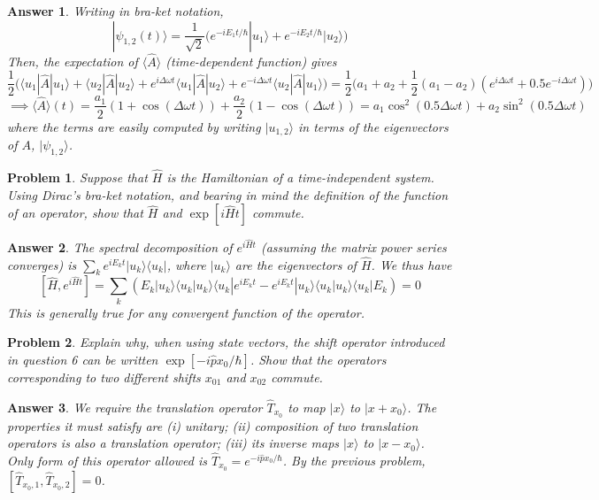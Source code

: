 \documentclass[a4paper]{article}
\newtheorem{ans}{Answer}[section]
\theoremstyle{new}
\newtheorem{qns}{Problem}[section]
\begin{document}
\begin{ans}
Writing in bra-ket notation,
$$|\psi_{1,2}(t)\rangle=\frac{1}{\sqrt{2}}\bigg(e^{-iE_1t/\hbar}|u_1\rangle+e^{-iE_2t/\hbar}|u_2\rangle\bigg)$$
Then, the expectation of $\langle\hat{A}\rangle$ (time-dependent function) gives
$$\frac{1}{2}\bigg(\langle u_1|\hat{A}|u_1\rangle+\langle u_2|\hat{A}|u_2\rangle+e^{i\Delta\omega t}\langle u_1|\hat{A}|u_2\rangle+e^{-i\Delta\omega t}\langle u_2|\hat{A}|u_1\rangle\bigg)=\frac{1}{2}\bigg(a_1+a_2+\frac{1}{2}(a_1-a_2)(e^{i\Delta\omega t}+0.5e^{-i\Delta\omega t})\bigg)$$
$$\implies\langle\hat{A}\rangle(t)=\frac{a_1}{2}(1+\cos(\Delta\omega t))+\frac{a_2}{2}(1-\cos(\Delta\omega t))=a_1\cos^2(0.5\Delta\omega t)+a_2\sin^2(0.5\Delta\omega t)$$
where the terms are easily computed by writing $|u_{1,2}\rangle$ in terms of the eigenvectors of $A$, $|\psi_{1,2}\rangle$.
\end{ans}
\begin{qns}
Suppose that $\hat{H}$ is the Hamiltonian of a time-independent system. Using Dirac's bra-ket notation, and bearing in mind the definition of the function of an operator, show that $\hat{H}$ and $\exp[i\hat{H}t]$ commute.
\end{qns}
\begin{ans}
The spectral decomposition of $e^{i\hat{H}t}$ (assuming the matrix power series converges) is $\sum_ke^{iE_kt}|u_k\rangle\langle u_k|$, where $|u_k\rangle$ are the eigenvectors of $\hat{H}$. We thus have
$$[\hat{H},e^{i\hat{H}t}]=\sum_k(E_k|u_k\rangle\langle u_k|u_k\rangle\langle u_k|e^{iE_kt}-e^{iE_kt}|u_k\rangle\langle u_k|u_k\rangle\langle u_k|E_k)=0$$
This is generally true for any convergent function of the operator.
\end{ans}
\begin{qns}
Explain why, when using state vectors, the shift operator introduced in question 6 can be written $\exp[-i\hat{p}x_0/\hbar]$. Show that the operators corresponding to two different shifts $x_{01}$ and $x_{02}$ commute.
\end{qns}
\begin{ans}
We require the translation operator $\hat{T}_{x_0}$ to map $|x\rangle$ to $|x+x_0\rangle$. The properties it must satisfy are (i) unitary; (ii) composition of two translation operators is also a translation operator; (iii) its inverse maps $|x\rangle$ to $|x-x_0\rangle$. Only form of this operator allowed is $\hat{T}_{x_0}=e^{-i\hat{p}x_0/\hbar}$. By the previous problem, $[\hat{T}_{x_0,1},\hat{T}_{x_0,2}]=0$.
\end{ans}
\newpage
\end{document}
